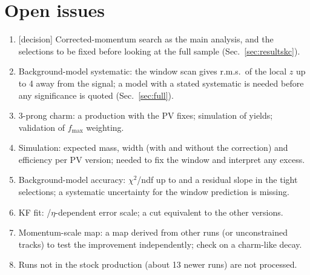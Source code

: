 \section{Open issues}
\label{sec:open}
\begin{enumerate}
\item {[decision]} Corrected-momentum search as the main analysis, and the selections to be fixed before looking at the
  full sample (Sec.~\ref{sec:resultskc}).
\item Background-model systematic: the window scan gives r.m.s.\ of the local $z$ up to 4 away from the signal; a
  model with a stated systematic is needed before any significance is quoted (Sec.~\ref{sec:full}).
\item 3-prong charm: a production with the PV fixes; simulation of yields; validation of $f_{\max}$ weighting.
\item Simulation: expected \Dzero{} mass, width (with and without the correction) and efficiency per PV version; needed
  to fix the window and interpret any excess.
\item Background-model accuracy: $\chi^2$/ndf up to \chiMaxNone{} and a residual slope in the tight selections; a
  systematic uncertainty for the window prediction is missing.
\item KF fit: \pt/$\eta$-dependent error scale; a \Ls{} cut equivalent to the other versions.
\item Momentum-scale map: a map derived from other runs (or unconstrained tracks) to test the \Ks{} improvement
  independently; check on a charm-like decay.
\item Runs not in the stock production (about 13 newer runs) are not processed.
\end{enumerate}
